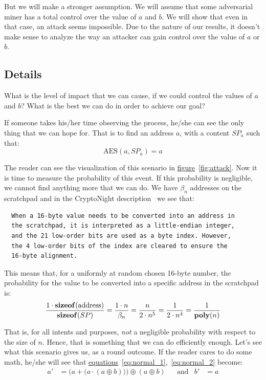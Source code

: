 But we will make a stronger assumption. We will assume that some adversarial miner has a total control over the value of $a$ and $b$. We will show that even in that case, an attack seems impossible. Due to the nature of our results, it doesn't make sense to analyze the way an attacker can gain control over the value of $a$ or $b$.

\subsection{Details}
What is the level of impact that we can cause, if we could control the values of $a$ and $b$? What is the best we can do in order to achieve our goal?

If someone takes his/her time observing the process, he/she can see the only thing that we can hope for. That is to find an address $a$, with a content $SP_a$ such that:
\begin{equation} \nonumber
  \mbox{AES}(a,SP_a) = a
\end{equation}

The reader can see the visualization of this scenario in \hyperref[fig:attack]{figure}~\ref{fig:attack}. Now it is time to measure the probability of this event. If this probability is negligible, we cannot find anything more that we can do. We have $\beta_n$ addresses on the scratchpad and in the CryptoNight description~\cite{cryptonight} we see that:
\begin{verbatim}
  When a 16-byte value needs to be converted into an address in
  the scratchpad, it is interpreted as a little-endian integer,
  and the 21 low-order bits are used as a byte index. However,
  the 4 low-order bits of the index are cleared to ensure the
  16-byte alignment.
\end{verbatim}

This means that, for a uniformly at random chosen 16-byte number, the probability for the value to be converted into a specific address in the scratchpad is:
\begin{equation} \nonumber
  \frac{1 \cdot \mbox{\textbf{sizeof}}(\mbox{address})}{\mbox{\textbf{sizeof}}(SP)} =
  \frac{1 \cdot n}{\beta_n} = \frac{n}{2 \cdot n^5} = \frac{1}{2 \cdot n^4} = \frac{1}{\mbox{\textbf{poly}}(n)}
\end{equation}

That is, for all intents and purposes, \emph{not} a negligible probability with respect to the size of $n$. Hence, that is something that we can do efficiently enough. Let's see what this scenario gives us, as a round outcome. If the reader cares to do some math, he/she will see that \hyperref[eq:normal_1]{equations}~\ref{eq:normal_1},~\ref{eq:normal_2} become:
\begin{align} \nonumber
  a' &= \Big( a + \big( a \cdot (a \oplus b) \big) \Big) \oplus (a \oplus b) &
  &\mbox{and} & b' &= a
\end{align}

